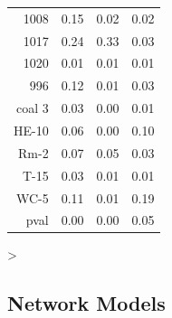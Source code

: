 \documentclass[12pt]{article}
\begin{document}
\begin{Schunk}
\begin{table}[ht]
\begin{center}
\begin{tabular}{rrrr}
  1008 & 0.15 & 0.02 & 0.02 \\ 
  1017 & 0.24 & 0.33 & 0.03 \\ 
  1020 & 0.01 & 0.01 & 0.01 \\ 
  996 & 0.12 & 0.01 & 0.03 \\ 
  coal 3 & 0.03 & 0.00 & 0.01 \\ 
  HE-10 & 0.06 & 0.00 & 0.10 \\ 
  Rm-2 & 0.07 & 0.05 & 0.03 \\ 
  T-15 & 0.03 & 0.01 & 0.01 \\ 
  WC-5 & 0.11 & 0.01 & 0.19 \\ 
  pval & 0.00 & 0.00 & 0.05 \\ 
   \hline
\end{tabular}
\end{center}
\end{table}\begin{Sinput}
> 
\end{Sinput}
\end{Schunk}

\subsection{Network Models}
\end{document}
